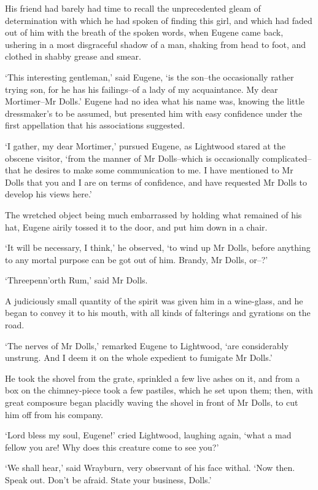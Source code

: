 His friend had barely had time to recall the unprecedented gleam of
determination with which he had spoken of finding this girl, and which
had faded out of him with the breath of the spoken words, when Eugene
came back, ushering in a most disgraceful shadow of a man, shaking from
head to foot, and clothed in shabby grease and smear.

‘This interesting gentleman,’ said Eugene, ‘is the son--the
occasionally rather trying son, for he has his failings--of a lady of my
acquaintance. My dear Mortimer--Mr Dolls.’ Eugene had no idea what his
name was, knowing the little dressmaker’s to be assumed, but presented
him with easy confidence under the first appellation that his
associations suggested.

‘I gather, my dear Mortimer,’ pursued Eugene, as Lightwood stared at
the obscene visitor, ‘from the manner of Mr Dolls--which is occasionally
complicated--that he desires to make some communication to me. I have
mentioned to Mr Dolls that you and I are on terms of confidence, and
have requested Mr Dolls to develop his views here.’

The wretched object being much embarrassed by holding what remained
of his hat, Eugene airily tossed it to the door, and put him down in a
chair.

‘It will be necessary, I think,’ he observed, ‘to wind up Mr Dolls,
before anything to any mortal purpose can be got out of him. Brandy, Mr
Dolls, or--?’

‘Threepenn’orth Rum,’ said Mr Dolls.

A judiciously small quantity of the spirit was given him in a
wine-glass, and he began to convey it to his mouth, with all kinds of
falterings and gyrations on the road.

‘The nerves of Mr Dolls,’ remarked Eugene to Lightwood, ‘are
considerably unstrung. And I deem it on the whole expedient to fumigate
Mr Dolls.’

He took the shovel from the grate, sprinkled a few live ashes on it, and
from a box on the chimney-piece took a few pastiles, which he set upon
them; then, with great composure began placidly waving the shovel in
front of Mr Dolls, to cut him off from his company.

‘Lord bless my soul, Eugene!’ cried Lightwood, laughing again, ‘what a
mad fellow you are! Why does this creature come to see you?’

‘We shall hear,’ said Wrayburn, very observant of his face withal. ‘Now
then. Speak out. Don’t be afraid. State your business, Dolls.’

